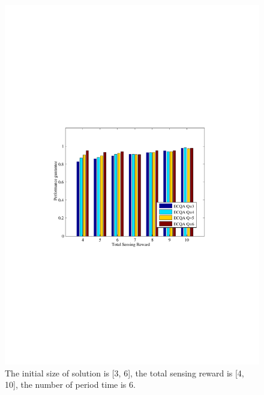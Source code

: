 \documentclass[journal]{IEEEtran}
\begin{document}
\begin{figure}[h]
	\centering
	\includegraphics[width=0.85\linewidth]{figure9.pdf}
	\caption{The initial size of solution is [3, 6], the total sensing reward is [4, 10], the number of period time is 6.}
	\label{fig:figure9}
\end{figure}
\end{document}
